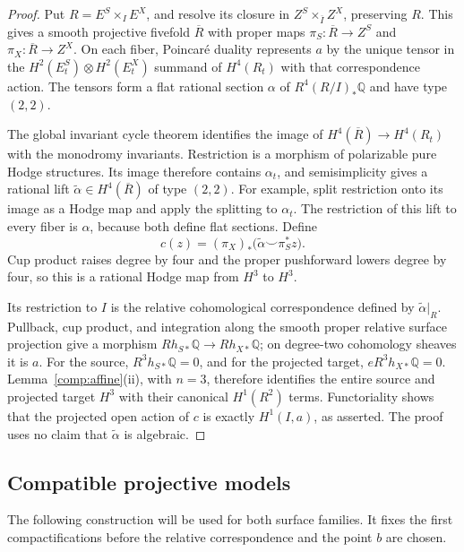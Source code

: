 \documentclass[11pt]{amsart}
\newcommand{\Q}{\mathbb Q}
\theoremstyle{definition}
\theoremstyle{remark}
\numberwithin{equation}{section}
\begin{document}
\begin{proof}
Put $R=E^S\times_I E^X$, and resolve its closure in
$Z^S\times_{\overline I}Z^X$, preserving $R$.
This gives a smooth projective fivefold $\overline R$ with proper maps
$\pi_S:\overline R\to Z^S$ and $\pi_X:\overline R\to Z^X$.
On each fiber, Poincar\'e duality represents $a$ by the unique tensor
in the $H^2(E^S_t)\otimes H^2(E^X_t)$ summand of $H^4(R_t)$ with that
correspondence action.  The tensors form a flat rational section
$\alpha$ of $R^4(R/I)_*\Q$ and have type $(2,2)$.

The global invariant cycle theorem
\cite[Theorem~4.1.1]{DeligneHodgeII} identifies the image of
$H^4(\overline R)\to H^4(R_t)$ with the monodromy invariants.
Restriction is a morphism of polarizable pure Hodge structures.
Its image therefore contains $\alpha_t$, and semisimplicity gives a
rational lift $\widetilde\alpha\in H^4(\overline R)$ of type $(2,2)$.
For example, split restriction onto its image as a Hodge map and apply
the splitting to $\alpha_t$.  The restriction of this lift to every
fiber is $\alpha$, because both define flat sections.
Define
\[
 c(z)=(\pi_X)_*
       \bigl(\widetilde\alpha\smile\pi_S^*z\bigr).
\]
Cup product raises degree by four and the proper pushforward lowers
degree by four, so this is a rational Hodge map from $H^3$ to $H^3$.

Its restriction to $I$ is the relative cohomological correspondence
defined by $\widetilde\alpha|_R$.  Pullback, cup product, and integration
along the smooth proper relative surface projection give a morphism
$Rh_{S*}\Q\to Rh_{X*}\Q$; on degree-two cohomology sheaves it is $a$.
For the source, $R^3h_{S*}\Q=0$, and for the projected target,
$eR^3h_{X*}\Q=0$.  Lemma~\ref{comp:affine}(ii), with $n=3$,
therefore identifies the entire source and projected target $H^3$ with
their canonical $H^1(R^2)$ terms.  Functoriality shows that the
projected open action of $c$ is exactly $H^1(I,a)$, as asserted.
The proof uses no claim that $\widetilde\alpha$ is algebraic.
\end{proof}

\subsection{Compatible projective models}

The following construction will be used for both surface families.
It fixes the first compactifications before the relative correspondence
and the point $b$ are chosen.
\end{document}

